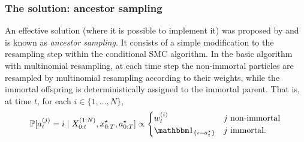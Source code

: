 

\subsubsection{The solution: ancestor sampling}
An effective solution (where it is possible to implement it) was proposed by \textcite{whiteley2010} and is known as \emph{ancestor sampling}.
It consists of a simple modification to the resampling step within the conditional SMC algorithm. 
In the basic algorithm with multinomial resampling, at each time step the non-immortal particles are resampled by multinomial resampling according to their weights, while the immortal offspring is deterministically assigned to the immortal parent. That is, at time $t$, for each $i \in \{1,\dots, N\}$,
\begin{equation*}
\Prob[a_t^{(j)} = i \mid X_{0:t}^{(1:N)}, x_{0:T}^\star, a_{0:T}^\star ] 
\propto \begin{cases}
w_t^{(i)} & j \text{ non-immortal} \\
\I{i = a_t^\star} & j \text{ immortal} .
\end{cases}
\end{equation*}


